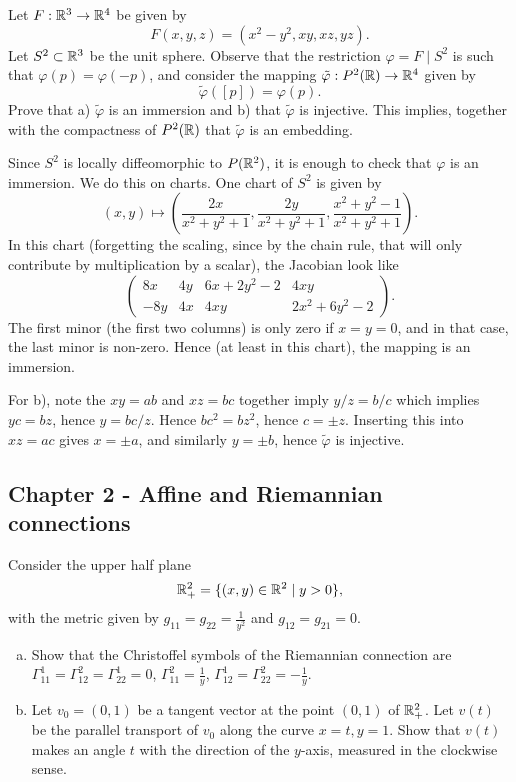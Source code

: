 \documentclass[11pt, english]{article}
\begin{document}
\begin{exc}

Let $F:\mathbb{R}^3 \to \mathbb{R}^4$ be given by
\[
F(x,y,z) = (x^2-y^2, xy,xz,yz).
\]  
Let $S^2 \subset \mathbb{R}^3$ be the unit sphere. Observe that the restriction $\varphi = F\mid S^2$ is such that $\varphi(p) = \varphi(-p)$, and consider the mapping $\tilde \varphi: P^2(\mathbb{R}) \to \mathbb{R}^4$ given by
\[
\tilde \varphi([p]) = \varphi(p).
\]
Prove that a) $\tilde \varphi$ is an immersion and b) that $\tilde \varphi$ is injective. This implies, together with the compactness of $P^2(\mathbb{R})$ that $\tilde \varphi$ is an embedding.
\end{exc}
\begin{sol}
Since $S^2$ is locally diffeomorphic to $P(\mathbb{R}^2)$, it is enough to check that $\varphi$ is an immersion. We do this on charts. One chart of $S^2$ is given by
\[
(x,y) \mapsto \left( \frac{2x}{x^2+y^2+1}, \frac{2y}{x^2+y^2+1}, \frac{x^2+y^2-1}{x^2+y^2+1} \right).
\]
In this chart (forgetting the scaling, since by the chain rule, that will only contribute by multiplication by a scalar), the Jacobian look like
\[
\begin{pmatrix}
  8x & 4y & 6x+2y^2-2 & 4xy \\
-8y & 4x & 4xy & 2x^2+6y^2-2
\end{pmatrix}.
\]
The first minor (the first two columns) is only zero if $x=y=0$, and in that case, the last minor is non-zero. Hence (at least in this chart), the mapping is an immersion.

For b), note the $xy=ab$ and $xz=bc$ together imply $y/z=b/c$ which implies $yc=bz$, hence $y=bc/z$. Hence $bc^2=bz^2$, hence $c = \pm z$. Inserting this into $xz=ac$ gives $x=\pm a$, and similarly $y=\pm b$, hence $\tilde \varphi$ is injective.
\end{sol}

\subsection{Chapter 2 - Affine and Riemannian connections}

\begin{exc}[Exercise 8]
Consider the upper half plane
\[
\mathbb{R}_+^2 = \{ (x,y) \in \mathbb{R}^2 \mid y > 0 \},
\]  
with the metric given by $g_{11}=g_{22}=\frac 1{y^2}$ and $g_{12}=g_{21}=0$.
\begin{enumerate}[a)]
\item Show that the Christoffel symbols of the Riemannian connection are $\Gamma_{11}^1=\Gamma_{12}^2 = \Gamma_{22}^1 = 0$, $\Gamma_{11}^2 = \frac{1}{y}$, $\Gamma_{12}^1 = \Gamma_{22}^2 = -\frac 1y$.
\item Let $v_0=(0,1)$ be a tangent vector at the point $(0,1)$ of $\mathbb{R}_+^2$. Let $v(t)$ be the parallel transport of $v_0$ along the curve $x=t,y=1$. Show that $v(t)$ makes an angle $t$ with the direction of the $y$-axis, measured in the clockwise sense.
\end{enumerate}
\end{exc}
\end{document}
